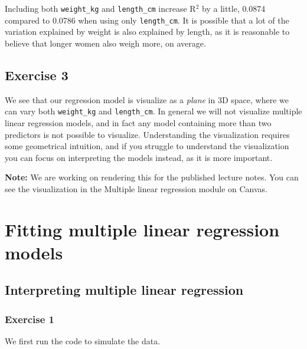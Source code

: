 \documentclass[
  letterpaper,
  DIV=11,
  numbers=noendperiod]{scrreprt}
\begin{document}
Including both \texttt{weight\_kg} and \texttt{length\_cm} increase
R\(^2\) by a little, 0.0874 compared to 0.0786 when using only
\texttt{length\_cm}. It is possible that a lot of the variation
explained by weight is also explained by length, as it is reasonable to
believe that longer women also weigh more, on average.

\subsection{Exercise 3}\label{exercise-3-19}

We see that our regression model is visualize as a \emph{plane} in 3D
space, where we can vary both \texttt{weight\_kg} and
\texttt{length\_cm}. In general we will not visualize multiple linear
regression models, and in fact any model containing more than two
predictors is not possible to visualize. Understanding the visualization
requires some geometrical intuition, and if you struggle to understand
the visualization you can focus on interpreting the models instead, as
it is more important.

\textbf{Note:} We are working on rendering this for the published
lecture notes. You can see the visualization in the Multiple linear
regression module on Canvas.

\section{Fitting multiple linear regression
models}\label{fitting-multiple-linear-regression-models-1}

\subsection{Interpreting multiple linear
regression}\label{interpreting-multiple-linear-regression-1}

\subsubsection{Exercise 1}\label{exercise-1-27}

We first run the code to simulate the data.
\end{document}
